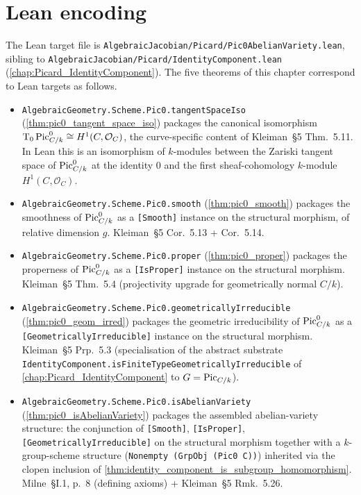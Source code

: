 \section{Lean encoding}
\label{sec:pic0_isAbelianVariety_lean_encoding}

The Lean target file is
\texttt{AlgebraicJacobian/Picard/Pic0AbelianVariety.lean}, sibling to
\texttt{AlgebraicJacobian/Picard/IdentityComponent.lean}
(\cref{chap:Picard_IdentityComponent}). The five theorems of this
chapter correspond to Lean targets as follows.

\begin{itemize}
  \item \texttt{AlgebraicGeometry.Scheme.Pic0.tangentSpaceIso}
    (\cref{thm:pic0_tangent_space_iso}) packages the canonical
    isomorphism
    \(\textup T_0 \operatorname{Pic}^0_{C/k} \cong H^1(C, \mathcal{O}_C)\), the
    curve-specific content of Kleiman~\S 5 Thm.~5.11. In Lean
    this is an isomorphism of \(k\)-modules between the Zariski
    tangent space of \(\operatorname{Pic}^0_{C/k}\) at the identity \(0\) and the
    first sheaf-cohomology \(k\)-module \(H^1(C, \mathcal{O}_C)\).
  \item \texttt{AlgebraicGeometry.Scheme.Pic0.smooth}
    (\cref{thm:pic0_smooth}) packages the smoothness of
    \(\operatorname{Pic}^0_{C/k}\) as a \texttt{[Smooth]} instance on the structural
    morphism, of relative dimension \(g\). Kleiman~\S 5
    Cor.~5.13 + Cor.~5.14.
  \item \texttt{AlgebraicGeometry.Scheme.Pic0.proper}
    (\cref{thm:pic0_proper}) packages the properness of
    \(\operatorname{Pic}^0_{C/k}\) as a \texttt{[IsProper]} instance on the
    structural morphism. Kleiman~\S 5 Thm.~5.4 (projectivity
    upgrade for geometrically normal \(C/k\)).
  \item \texttt{AlgebraicGeometry.Scheme.Pic0.geometricallyIrreducible}
    (\cref{thm:pic0_geom_irred}) packages the geometric
    irreducibility of \(\operatorname{Pic}^0_{C/k}\) as a
    \texttt{[GeometricallyIrreducible]} instance on the structural
    morphism. Kleiman~\S 5 Prp.~5.3 (specialisation of the
    abstract substrate
    \texttt{IdentityComponent.isFiniteTypeGeometricallyIrreducible}
    of \cref{chap:Picard_IdentityComponent} to \(G = \operatorname{Pic}_{C/k}\)).
  \item \texttt{AlgebraicGeometry.Scheme.Pic0.isAbelianVariety}
    (\cref{thm:pic0_isAbelianVariety}) packages the assembled
    abelian-variety structure: the conjunction of \texttt{[Smooth]},
    \texttt{[IsProper]}, \texttt{[GeometricallyIrreducible]} on the
    structural morphism together with a \(k\)-group-scheme structure
    (\texttt{Nonempty (GrpObj (Pic0 C))}) inherited via the clopen
    inclusion of \cref{thm:identity_component_is_subgroup_homomorphism}.
    Milne~\S I.1, p.~8 (defining axioms) + Kleiman~\S 5
    Rmk.~5.26.
\end{itemize}

